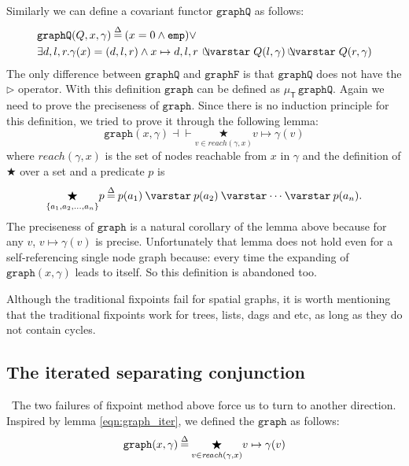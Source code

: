 Similarly we can define a covariant functor $\mathtt{graphQ}$ as
follows:
\[\label{eqn:graphFco}
  \begin{split}
  & \mathtt{graphQ}(Q, x, \gamma)\defeq (x = 0 \wedge
  \mathtt{emp}) \vee \\ & \exists d,l,r . \gamma(x)=(d,l,r) \wedge  x
  \mapsto d,l,r\, \ocon Q(l, \gamma) \ocon Q(r, \gamma)
  \end{split}
\]
The only difference between $\mathtt{graphQ}$ and $\mathtt{graphF}$ is
that $\mathtt{graphQ}$ does not have the $\triangleright$
operator. With this definition $\mathtt{graph}$ can be defined as
$\mu_{\mathsf{T}}\,\mathtt{graphQ}$. Again we need to prove the
preciseness of $\mathtt{graph}$. Since there is no induction principle
for this definition, we tried to prove it through the following lemma:
\begin{equation}\label{eqn:graph_iter}
\mathtt{graph}(x, \gamma) \dashv\vdash
\underset{v\in\mathit{reach}(\gamma, x)}{\bigstar} v\mapsto\gamma(v)
\end{equation}
where $\mathit{reach}(\gamma, x)$ is the set of nodes reachable from
$x$ in $\gamma$ and the definition of $\bigstar$ over a set and a
predicate $p$ is
\begin{equation*}
  \underset{\{a_1, a_2,\dots,a_n\}}{\bigstar}p \defeq p(a_1) \scon
  p(a_2) \scon \dots \scon p(a_n).
\end{equation*}
The preciseness of $\mathtt{graph}$ is a natural corollary of the
lemma above because for any $v$, $v\mapsto\gamma(v)$ is
precise. Unfortunately that lemma does not hold even for a
self-referencing single node graph because: every time the expanding
of $\mathtt{graph}(x,\gamma)$ leads to itself. So this definition is
abandoned too.

Although the traditional fixpoints fail for spatial graphs, it is
worth mentioning that the traditional fixpoints work for trees, lists,
dags and etc, as long as they do not contain cycles.

\subsection{The iterated separating conjunction}\
The two failures of fixpoint method above force us to turn to another
direction. Inspired by lemma \ref{eqn:graph_iter}, we defined the
$\mathtt{graph}$ as follows:
\begin{equation}\label{eqn:iter_def}
  \mathtt{graph}(x, \gamma)\mathbin{\stackrel{\Delta}{=}}\underset{v\in\mathit{reach}(\gamma, x)}{\bigstar} v\mapsto\gamma(v)
\end{equation}

